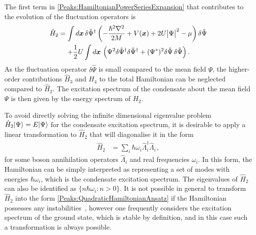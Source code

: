 The first term in \eqref{Peaks:HamiltonianPowerSeriesExpansion} that contributes to the evolution of the fluctuation operators is
\begin{align}
    \begin{split}
        \hat{H}_2 &= \int d \vect{x}\, \delta \hat{\Psi}^\dagger \left(-\frac{\hbar^2 \nabla^2}{2 M} + V(\vect{x}) + 2 U\big|\Psi\big|^2 -\mu \right)\delta\hat{\Psi}\\
         &\relphantom{=} + \frac{1}{2} U\int d \vect{x}\, \left(\Psi^2 \delta \hat{\Psi}^\dagger\delta \hat{\Psi}^\dagger  +  (\Psi^*)^2 \delta \hat{\Psi} \,\delta \hat{\Psi}\right).
    \end{split}
    \label{Peaks:HamiltonianPowerSeriesQuadraticTerm}
\end{align}
As the fluctuation operator $\delta \hat{\Psi}$ is small compared to the mean field $\Psi$, the higher-order contributions $\hat{H}_3$ and $\hat{H}_4$ to the total Hamiltonian can be neglected compared to $\hat{H}_2$. The excitation spectrum of the condensate about the mean field $\Psi$ is then given by the energy spectrum of $\hat{H}_2$.

To avoid directly solving the infinite dimensional eigenvalue problem $\hat{H}_2 {\left|\Psi\right>} = E {\left|\Psi\right>}$ for the condensate excitation spectrum, it is desirable to apply a linear transformation to $\hat{H}_2$ that will diagonalise it in the form
\begin{align}
    \label{Peaks:QuadraticHamiltonianAnsatz}
    \hat{H}_2 &= \sum_i \hbar \omega_i \hat{\Lambda}_i^\dagger \hat{\Lambda}_i^{\phantom{\dagger}},
\end{align}
for some boson annihilation operators $\hat{\Lambda}_i$ and real frequencies $\omega_i$. In this form, the Hamiltonian can be simply interpreted as representing a set of modes with energies $\hbar \omega_i$, which is the condensate excitation spectrum. The eigenvalues of $\hat{H}_2$ can also be identified as $\{n \hbar \omega_i : n > 0 \}$. It is not possible in general to transform $\hat{H}_2$ into the form \eqref{Peaks:QuadraticHamiltonianAnsatz} if the Hamiltonian possesses any instabilities~\citep{Leonhardt:2003}, however one frequently considers the excitation spectrum of the ground state, which is stable by definition, and in this case such a transformation is always possible.


